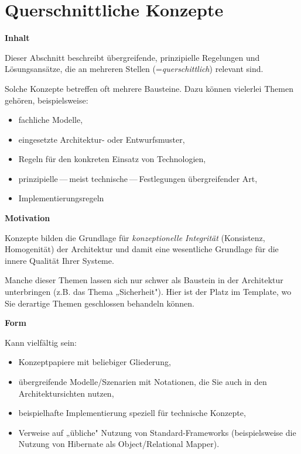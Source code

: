 \hypertarget{querschnittliche-konzepte}{%
\section{Querschnittliche Konzepte}\label{querschnittliche-konzepte}}

\textbf{Inhalt}

Dieser Abschnitt beschreibt übergreifende, prinzipielle Regelungen und
Lösungsansätze, die an mehreren Stellen (=\emph{querschittlich})
relevant sind.

Solche Konzepte betreffen oft mehrere Bausteine. Dazu können vielerlei
Themen gehören, beispielsweise:

\begin{itemize}
\tightlist
\item
  fachliche Modelle,
\item
  eingesetzte Architektur- oder Entwurfsmuster,
\item
  Regeln für den konkreten Einsatz von Technologien,
\item
  prinzipielle --- meist technische --- Festlegungen übergreifender Art,
\item
  Implementierungsregeln
\end{itemize}

\textbf{Motivation}

Konzepte bilden die Grundlage für \emph{konzeptionelle Integrität}
(Konsistenz, Homogenität) der Architektur und damit eine wesentliche
Grundlage für die innere Qualität Ihrer Systeme.

Manche dieser Themen lassen sich nur schwer als Baustein in der
Architektur unterbringen (z.B. das Thema „Sicherheit"). Hier ist der
Platz im Template, wo Sie derartige Themen geschlossen behandeln können.

\textbf{Form}

Kann vielfältig sein:

\begin{itemize}
\item
  Konzeptpapiere mit beliebiger Gliederung,
\item
  übergreifende Modelle/Szenarien mit Notationen, die Sie auch in den
  Architektursichten nutzen,
\item
  beispielhafte Implementierung speziell für technische Konzepte,
\item
  Verweise auf „übliche" Nutzung von Standard-Frameworks (beispielsweise
  die Nutzung von Hibernate als Object/Relational Mapper).
\end{itemize}

